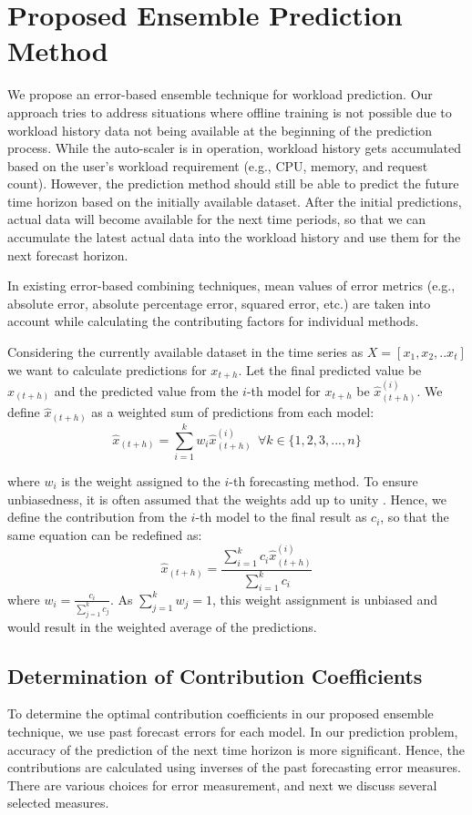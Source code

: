 \section{Proposed Ensemble Prediction Method}

We propose an error-based ensemble technique for workload prediction. Our approach tries to address situations where offline training is not possible due to workload history data not being available at the beginning of the prediction process. While the auto-scaler is in operation, workload history gets accumulated based on the user's workload requirement (e.g., CPU, memory, and request count). However, the prediction method should still be able to predict the future time horizon based on the initially available dataset. After the initial predictions, actual data will become available for the next time periods, so that we can accumulate the latest actual data into the workload history and use them for the next forecast horizon.

In existing error-based combining techniques, mean values of error metrics (e.g., absolute error, absolute percentage error, squared error, etc.) are taken into account while calculating the contributing factors for individual methods. 

Considering the currently available dataset in the time series as
$X=[x_{1},x_{2},.. x_{t}]$
we want to calculate predictions for $x_{t+h}$. Let the final predicted value be $\hat{x}_{(t+h)}$ and the predicted value from the $i$-th model for $x_{t+h}$ be $\hat{x}_{(t+h)}^{(i)}$. We define $\hat{x}_{(t+h)}$ as a weighted sum of predictions from each model:
$$\hat{x}_{(t+h)}= \sum_{i=1}^{k}w_i \hat{x}_{(t+h)}^{(i)} \ \ \forall k \in \{1,2,3,...,n\}$$

where $w_i$ is the weight assigned to the $i$-th forecasting method. To ensure unbiasedness, it is often assumed that the weights add up to unity \cite{Adhikari_2012}. Hence, we define the contribution from the $i$-th model to the final result as $c_i$, so that the same equation can be redefined as:
$$\hat{x}_{(t+h)}= \frac{\sum_{i=1}^{k}c_i \hat{x}_{(t+h)}^{(i)}}{\sum_{i=1}^{k}c_i}$$ 
where $w_{i}= \frac{c_{i}}{\sum_{j=1}^{k}c_j}$. As $\sum_{j=1}^{k}w_{j}=1$, this weight assignment is unbiased and would result in the weighted average of the predictions.

\subsection{Determination of Contribution Coefficients}
To determine the optimal contribution coefficients in our proposed ensemble technique, we use past forecast errors for each model. In our prediction problem, accuracy of the prediction of the next time horizon is more significant. Hence, the contributions are calculated using inverses of the past forecasting error measures. There are various choices for error measurement, and next we discuss several selected measures.

